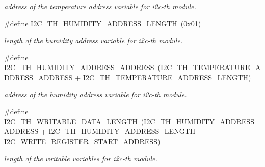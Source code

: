 \begin{DoxyCompactItemize}
\begin{DoxyCompactList}\small\item\em address of the temperature address variable for i2c-\/th module. \end{DoxyCompactList}\item 
\mbox{\label{registers-th_8h_abaf123f62e7e2d51c831c7379e55fba7}} 
\#define \hyperlink{registers-th_8h_abaf123f62e7e2d51c831c7379e55fba7}{I2\+C\+\_\+\+T\+H\+\_\+\+H\+U\+M\+I\+D\+I\+T\+Y\+\_\+\+A\+D\+D\+R\+E\+S\+S\+\_\+\+L\+E\+N\+G\+TH}~(0x01)
\begin{DoxyCompactList}\small\item\em length of the humidity address variable for i2c-\/th module. \end{DoxyCompactList}\item 
\mbox{\label{registers-th_8h_a2d41bc44e9839348561ba855d74451dd}} 
\#define \hyperlink{registers-th_8h_a2d41bc44e9839348561ba855d74451dd}{I2\+C\+\_\+\+T\+H\+\_\+\+H\+U\+M\+I\+D\+I\+T\+Y\+\_\+\+A\+D\+D\+R\+E\+S\+S\+\_\+\+A\+D\+D\+R\+E\+SS}~(\hyperlink{registers-th_8h_adcb39cb83eb5044753bb04c0d050ecba}{I2\+C\+\_\+\+T\+H\+\_\+\+T\+E\+M\+P\+E\+R\+A\+T\+U\+R\+E\+\_\+\+A\+D\+D\+R\+E\+S\+S\+\_\+\+A\+D\+D\+R\+E\+SS} + \hyperlink{registers-th_8h_a5279f5408464c6419cb81ff8ef8f4480}{I2\+C\+\_\+\+T\+H\+\_\+\+T\+E\+M\+P\+E\+R\+A\+T\+U\+R\+E\+\_\+\+A\+D\+D\+R\+E\+S\+S\+\_\+\+L\+E\+N\+G\+TH})
\begin{DoxyCompactList}\small\item\em address of the humidity address variable for i2c-\/th module. \end{DoxyCompactList}\item 
\mbox{\label{registers-th_8h_a37f451b20ab84aee9cd8521b5e33a725}} 
\#define \hyperlink{registers-th_8h_a37f451b20ab84aee9cd8521b5e33a725}{I2\+C\+\_\+\+T\+H\+\_\+\+W\+R\+I\+T\+A\+B\+L\+E\+\_\+\+D\+A\+T\+A\+\_\+\+L\+E\+N\+G\+TH}~(\hyperlink{registers-th_8h_a2d41bc44e9839348561ba855d74451dd}{I2\+C\+\_\+\+T\+H\+\_\+\+H\+U\+M\+I\+D\+I\+T\+Y\+\_\+\+A\+D\+D\+R\+E\+S\+S\+\_\+\+A\+D\+D\+R\+E\+SS} + \hyperlink{registers-th_8h_abaf123f62e7e2d51c831c7379e55fba7}{I2\+C\+\_\+\+T\+H\+\_\+\+H\+U\+M\+I\+D\+I\+T\+Y\+\_\+\+A\+D\+D\+R\+E\+S\+S\+\_\+\+L\+E\+N\+G\+TH} -\/ \hyperlink{registers_8h_ad980dee82f83659f0a84e3e1f3c177bb}{I2\+C\+\_\+\+W\+R\+I\+T\+E\+\_\+\+R\+E\+G\+I\+S\+T\+E\+R\+\_\+\+S\+T\+A\+R\+T\+\_\+\+A\+D\+D\+R\+E\+SS})
\begin{DoxyCompactList}\small\item\em length of the writable variables for i2c-\/th module. \end{DoxyCompactList}\end{DoxyCompactItemize}

